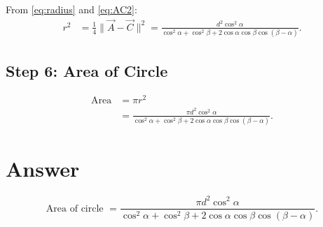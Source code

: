 \documentclass[journal]{IEEEtran}
\begin{document}
From \eqref{eq:radius} and \eqref{eq:AC2}:
\begin{align}
r^2 &= \frac{1}{4}\|\vec{A}-\vec{C}\|^2 
= \frac{d^2 \cos^2 \alpha}{\cos^2 \alpha + \cos^2 \beta + 2 \cos \alpha \cos \beta \cos(\beta-\alpha)}. \label{eq:r2final}
\end{align}

\subsection*{Step 6: Area of Circle}

\begin{align}
\text{Area} &= \pi r^2 \\
&= \frac{\pi d^2 \cos^2 \alpha}{\cos^2 \alpha + \cos^2 \beta + 2 \cos \alpha \cos \beta \cos(\beta-\alpha)}. \label{eq:area}
\end{align}

\section*{Answer}
\[
\boxed{\text{Area of circle } = \frac{\pi d^2 \cos^2 \alpha}{\cos^2 \alpha + \cos^2 \beta + 2 \cos \alpha \cos \beta \cos(\beta - \alpha)}}.
\]
\end{document}

